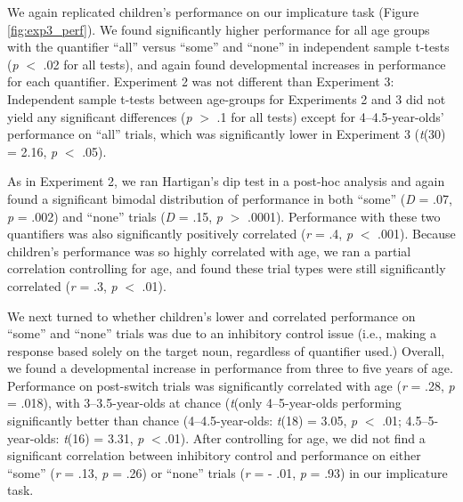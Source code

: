 \documentclass[man]{apa2}
\begin{document}
We again replicated children's performance on our implicature task (Figure \ref{fig:exp3_perf}). We found significantly higher performance for all age groups with the quantifier ``all'' versus ``some'' and ``none'' in independent sample t-tests (\emph{p} $<$ .02 for all tests), and again found developmental increases in performance for each quantifier. Experiment 2 was not different than Experiment 3: Independent sample t-tests between  age-groups for Experiments 2 and 3 did not yield any significant differences (\emph{p} $>$ .1 for all tests) except for 4--4.5-year-olds' performance on ``all'' trials, which was significantly lower in Experiment 3 (\emph{t}(30) = 2.16, \emph{p} $<$ .05).


As in Experiment 2, we ran Hartigan's dip test in a post-hoc analysis and again found a significant bimodal distribution of performance in both ``some'' (\textit{D} = .07, \textit{p} = .002) and ``none'' trials (\textit{D} = .15, \textit{p} $>$ .0001). Performance with these two quantifiers was also significantly positively correlated (\emph{r} = .4, \emph{p} $<$ .001). Because children's performance was so highly correlated with age, we ran a partial correlation controlling for age, and found these trial types were still significantly correlated (\emph{r} = .3, \emph{p} $<$ .01).


%

We next turned to whether children's lower and correlated performance on ``some'' and ``none'' trials was due to an inhibitory control issue (i.e., making a response based solely on the target noun, regardless of quantifier used.)
Overall, we found a developmental increase in performance from three to five years of age. Performance on post-switch trials was significantly correlated with age (\textit{r} = .28, \textit{p} = .018), with 3--3.5-year-olds at chance (\emph{t}(only 4--5-year-olds performing significantly better than chance (4--4.5-year-olds: \emph{t}(18) = 3.05, \emph{p} $<$ .01; 4.5--5-year-olds: \emph{t}(16) = 3.31, \emph{p} $< $.01). After controlling for age, we did not find a significant correlation between inhibitory control and performance on either ``some'' (\textit{r} = .13, \textit{p} = .26) or ``none'' trials (\textit{r} = - .01, \textit{p} = .93) in our implicature task.
\end{document}
